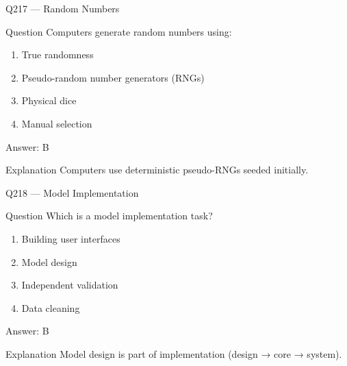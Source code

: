 \documentclass[aspectratio=169,8pt]{beamer}
\begin{document}
								\begin{frame}{Q217 --- Random Numbers}
									\begin{block}{Question}
										Computers generate random numbers using:
										\begin{enumerate}
											\item True randomness
											\item Pseudo-random number generators (RNGs)
											\item Physical dice
											\item Manual selection
										\end{enumerate}
									\end{block}
									\begin{exampleblock}{Answer: B}\end{exampleblock}
									\begin{block}{Explanation}
										Computers use deterministic pseudo-RNGs seeded initially.
									\end{block}
								\end{frame}
								
								\begin{frame}{Q218 --- Model Implementation}
									\begin{block}{Question}
										Which is a model implementation task?
										\begin{enumerate}
											\item Building user interfaces
											\item Model design
											\item Independent validation
											\item Data cleaning
										\end{enumerate}
									\end{block}
									\begin{exampleblock}{Answer: B}\end{exampleblock}
									\begin{block}{Explanation}
										Model design is part of implementation (design → core → system).
									\end{block}
								\end{frame}
								
\end{document}
